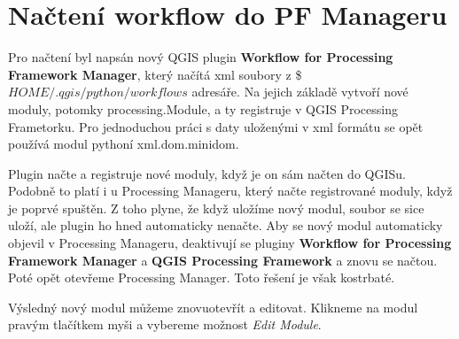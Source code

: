 \newpage
\section{Načtení workflow do PF Manageru}
Pro načtení byl napsán nový QGIS plugin \textbf{Workflow for Processing Framework Manager}, který načítá xml soubory z \$$HOME/.qgis/python/workflows$ adresáře. Na jejich základě vytvoří nové moduly, potomky processing.Module, a ty registruje v QGIS Processing Frametorku. Pro jednoduchou práci s daty uloženými v xml formátu se opět používá modul pythoní xml.dom.minidom.

Plugin načte a registruje nové moduly, když je on sám načten do QGISu. Podobně to platí i u Processing Manageru, který načte registrované moduly, když je poprvé spuštěn. Z toho plyne, že když uložíme nový modul, soubor se sice uloží, ale plugin ho hned automaticky nenačte. Aby se nový modul automaticky objevil v Processing Manageru, deaktivují se pluginy \textbf{Workflow for Processing Framework Manager} a \textbf{QGIS Processing Framework} a znovu se načtou. Poté opět otevřeme Processing Manager. Toto řešení je však kostrbaté.

Výsledný nový modul můžeme znovuotevřít a editovat. Klikneme na modul pravým tlačítkem myši a vybereme možnost \textit{Edit Module}.